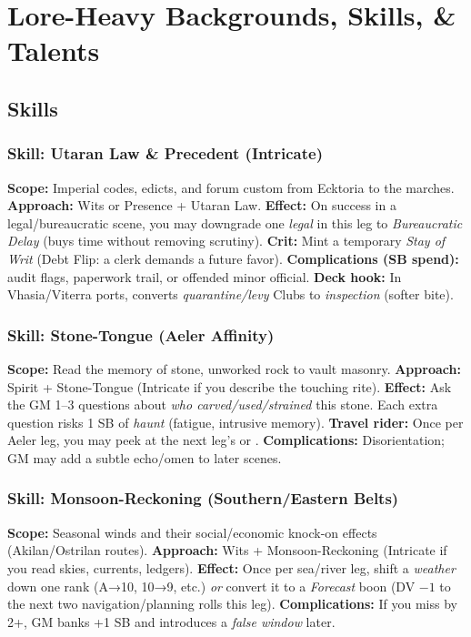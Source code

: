 \chapter{Lore-Heavy Backgrounds, Skills, \& Talents}

\section{Skills}

\subsection{Skill: Utaran Law \& Precedent (Intricate)}
\textbf{Scope:} Imperial codes, edicts, and forum custom from Ecktoria to the marches.
\textbf{Approach:} Wits or Presence + Utaran Law.
\textbf{Effect:} On success in a legal/bureaucratic scene, you may downgrade one \emph{legal} \SuitClub{} in this leg to \emph{Bureaucratic Delay} (buys time without removing scrutiny).
\textbf{Crit:} Mint a temporary \SuitDiamond{} \emph{Stay of Writ} (Debt Flip: a clerk demands a future favor).
\textbf{Complications (SB spend):} audit flags, paperwork trail, or offended minor official.
\textbf{Deck hook:} In Vhasia/Viterra ports, converts \emph{quarantine/levy} Clubs to \emph{inspection} (softer bite).

\subsection{Skill: Stone-Tongue (Aeler Affinity)}
\textbf{Scope:} Read the memory of stone, unworked rock to vault masonry.
\textbf{Approach:} Spirit + Stone-Tongue (Intricate if you describe the touching rite).
\textbf{Effect:} Ask the GM 1--3 questions about \emph{who carved/used/strained} this stone. Each extra question risks 1 SB of \emph{haunt} (fatigue, intrusive memory).
\textbf{Travel rider:} Once per Aeler leg, you may peek at the next leg's \SuitSpade{} or \SuitClub{}.
\textbf{Complications:} Disorientation; GM may add a subtle echo/omen to later scenes.

\subsection{Skill: Monsoon-Reckoning (Southern/Eastern Belts)}
\textbf{Scope:} Seasonal winds and their social/economic knock-on effects (Akilan/Ostrilan routes).
\textbf{Approach:} Wits + Monsoon-Reckoning (Intricate if you read skies, currents, ledgers).
\textbf{Effect:} Once per sea/river leg, shift a \emph{weather} \SuitClub{} down one rank (A→10, 10→9, etc.) \emph{or} convert it to a \emph{Forecast} boon (DV $-1$ to the next two navigation/planning rolls this leg).
\textbf{Complications:} If you miss by 2+, GM banks +1 SB and introduces a \emph{false window} later.

